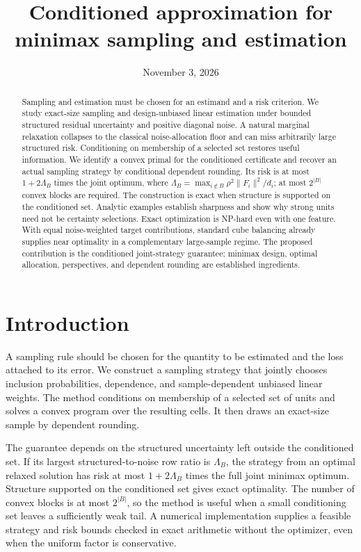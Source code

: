 \documentclass[11pt]{article}
\title{Conditioned approximation for minimax sampling and estimation}
\author{}
\date{November 3, 2026}
\begin{document}
\maketitle
\begin{abstract}
Sampling and estimation must be chosen for an estimand and a risk
criterion. We study exact-size sampling and design-unbiased linear
estimation under bounded structured residual uncertainty and positive
diagonal noise. A natural marginal relaxation collapses to the classical
noise-allocation floor and can miss arbitrarily large structured risk.
Conditioning on membership of a selected set restores useful
information. We identify a convex primal for the conditioned certificate
and recover an actual sampling strategy by conditional dependent
rounding. Its risk is at most \(1+2\Lambda_B\) times the joint optimum,
where \(\Lambda_B=\max_{i\notin B}\rho^2\|F_i\|^2/d_i\); at most
\(2^{|B|}\) convex blocks are required. The construction is exact when
structure is supported on the conditioned set. Analytic examples
establish sharpness and show why strong units need not be certainty
selections. Exact optimization is NP-hard even with one feature.
With equal noise-weighted target contributions, standard cube balancing
already supplies near optimality in a complementary large-sample regime.
The proposed contribution is the
conditioned joint-strategy guarantee; minimax design, optimal
allocation, perspectives, and dependent rounding are established
ingredients.
\end{abstract}
\section{Introduction}\label{introduction}

A sampling rule should be chosen for the quantity to be estimated and
the loss attached to its error. We construct a sampling strategy that
jointly chooses inclusion probabilities, dependence, and
sample-dependent unbiased linear weights. The method conditions on
membership of a selected set of units and solves a convex program over
the resulting cells. It then draws an exact-size sample by dependent
rounding.

The guarantee depends on the structured uncertainty left outside the
conditioned set. If its largest structured-to-noise row ratio is
\(\Lambda_B\), the strategy from an optimal relaxed solution has risk at
most \(1+2\Lambda_B\) times the full joint minimax optimum. Structure
supported on the conditioned set gives exact optimality. The number of
convex blocks is at most \(2^{|B|}\), so the method is useful when a
small conditioning set leaves a sufficiently weak tail. A numerical
implementation supplies a feasible strategy and risk bounds checked in
exact arithmetic without the optimizer, even when the uniform factor is
conservative.
\end{document}
